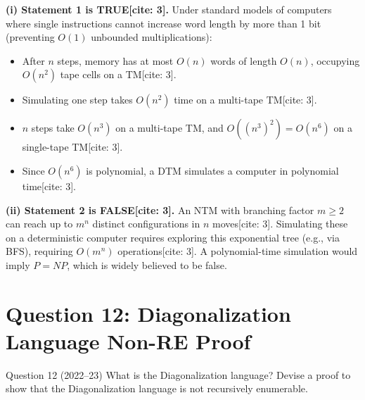 \documentclass[11pt,a4paper]{article}
\begin{document}
\begin{solutionbox}
\textbf{(i) Statement 1 is TRUE[cite: 3].}
Under standard models of computers where single instructions cannot increase word length by more than 1 bit (preventing $O(1)$ unbounded multiplications):
\begin{itemize}[leftmargin=*]
    \item After $n$ steps, memory has at most $O(n)$ words of length $O(n)$, occupying $O(n^2)$ tape cells on a TM[cite: 3].
    \item Simulating one step takes $O(n^2)$ time on a multi-tape TM[cite: 3].
    \item $n$ steps take $O(n^3)$ on a multi-tape TM, and $O((n^3)^2) = O(n^6)$ on a single-tape TM[cite: 3].
    \item Since $O(n^6)$ is polynomial, a DTM simulates a computer in polynomial time[cite: 3].
\end{itemize}

\textbf{(ii) Statement 2 is FALSE[cite: 3].}
An NTM with branching factor $m \ge 2$ can reach up to $m^n$ distinct configurations in $n$ moves[cite: 3]. Simulating these on a deterministic computer requires exploring this exponential tree (e.g., via BFS), requiring $O(m^n)$ operations[cite: 3]. A polynomial-time simulation would imply $P = NP$, which is widely believed to be false.
\end{solutionbox}

\section{Question 12: Diagonalization Language Non-RE Proof}
\begin{questionbox}{Question 12 (2022--23)}
What is the Diagonalization language? Devise a proof to show that the Diagonalization language is not recursively enumerable.
\end{questionbox}
\end{document}
